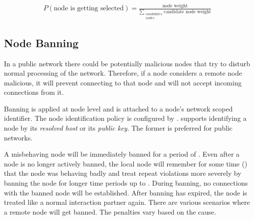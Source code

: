 \begin{align*}
P(\textrm{node is getting selected}) = \frac{\textrm{node weight}}{\sum\limits_{\substack{candidates\\nodes}} \textrm{candidate node weight}}
\end{align*}

\subsection{Node Banning}
\label{sec:reputation:NodeBanning}

In a public network there could be potentially malicious nodes that try to disturb normal processing of the network.
Therefore, if a node considers a remote node malicious, it will prevent connecting to that node and will not accept incoming connections from it.

Banning is applied at node level and is attached to a node's network scoped identifier.
The node identification policy is configured by .
\codenamespace supports identifying a node by its {\it resolved host} or its {\it public key}.
The former is preferred for public networks.

A misbehaving node will be immediately banned for a period of .
Even after a node is no longer actively banned, the local node will remember for some time () that the node was behaving badly and treat repeat violations more severely by banning the node for longer time periods up to .
During banning, no connections with the banned node will be established.
After banning has expired, the node is treated like a normal interaction partner again.
There are various scenarios where a remote node will get banned.
The penalties vary based on the cause.


